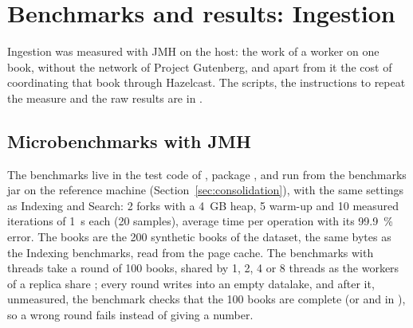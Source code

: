 \section{Benchmarks and results: Ingestion}
\label{sec:benchmarks-ingestion}

Ingestion was measured with JMH on the host: the work of a worker on one book, without the network of Project Gutenberg,
and apart from it the cost of coordinating that book through Hazelcast. The scripts, the instructions to repeat the
measure and the raw results are in .

\subsection{Microbenchmarks with JMH}

The benchmarks live in the test code of , package , and run from the
benchmarks jar on the reference machine (Section~\ref{sec:consolidation}), with the same settings as Indexing and Search:
2 forks with a 4~GB heap, 5 warm-up and 10 measured iterations of 1~s each (20 samples), average time per operation with
its 99.9~\% error. The books are the 200 synthetic books of the dataset, the same bytes as the Indexing benchmarks, read
from the page cache. The benchmarks with threads take a round of 100 books, shared by 1, 2, 4 or 8 threads as the workers
of a replica share ; every round writes into an empty datalake, and after it, unmeasured, the benchmark
checks that the 100 books are complete (or  and in ), so a wrong round fails instead of
giving a number.

